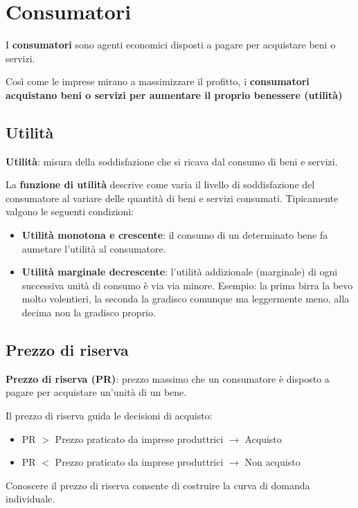 \documentclass[../main.tex]{subfiles}
\begin{document}
\section{Consumatori}

I \textbf{consumatori} sono agenti economici disposti a pagare per acquistare beni o servizi.

Così come le imprese mirano a massimizzare il profitto, i \textbf{consumatori acquistano beni o servizi per aumentare il proprio benessere (utilità)}

\subsection{Utilità}

\textbf{Utilità}: misura della soddisfazione che si ricava dal consumo di beni e servizi.

La \textbf{funzione di utilità} descrive come varia il livello di soddisfazione del consumatore al variare delle quantità di beni e servizi consumati. Tipicamente valgono le seguenti condizioni:
\begin{itemize}
	\item \textbf{Utilità monotona e crescente}: il consumo di un determinato bene fa aumetare l'utilità al consumatore.
	\item \textbf{Utilità marginale decrescente}: l'utilità addizionale (marginale) di ogni successiva unità di consumo è via via minore. Esempio: la prima birra la bevo molto volentieri, la seconda la gradisco comunque ma leggermente meno, alla decima non la gradisco proprio.
\end{itemize}

\subsection{Prezzo di riserva}

\textbf{Prezzo di riserva (PR)}: prezzo massimo che un consumatore è disposto a pagare per acquistare un'unità di un bene.

Il prezzo di riserva guida le decisioni di acquisto:
\begin{itemize}
	\item PR $>$ Prezzo praticato da imprese produttrici $\rightarrow$ Acquisto
	\item PR $<$ Prezzo praticato da imprese produttrici $\rightarrow$ Non acquisto
\end{itemize}

Conoscere il prezzo di riserva consente di costruire la curva di domanda individuale.
\end{document}

